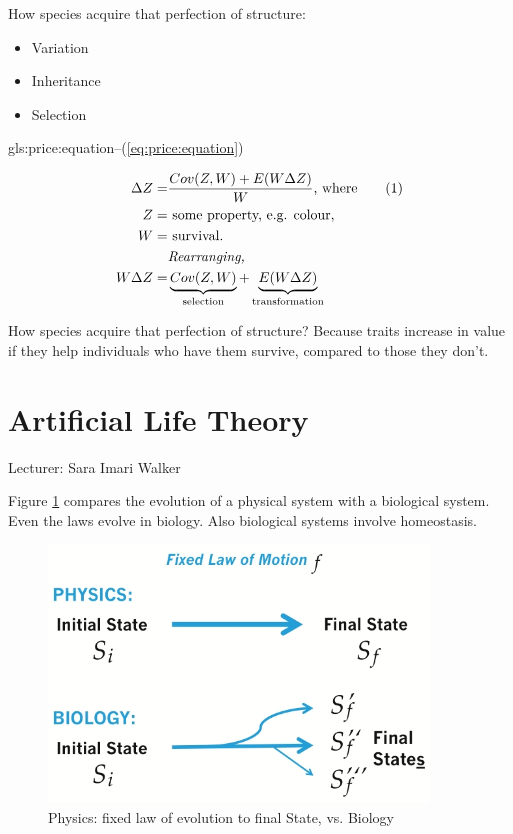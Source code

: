\documentclass[]{article}
\newcommand\numberthis{\addtocounter{equation}{1}\tag{\theequation}}
\begin{document}
How species acquire that perfection of structure:
\begin{itemize}
	\item Variation
	\item Inheritance
	\item Selection
\end{itemize}

\gls{gls:price:equation}--(\ref{eq:price:equation})

\begin{align*}
\Delta Z =& \frac{Cov(Z,W) + E(W \Delta Z)}{W}\text{, where} \numberthis \label{eq:price:equation}\\
Z=& \text{ some property, e.g. colour,}\\
W=& \text{ survival.}\\
 & \textit{Rearranging, }\\
W \Delta Z =& \underbrace{Cov(Z,W)}_\text{selection} + \underbrace{E(W \Delta Z)}_\text{transformation}
\end{align*}

How species acquire that perfection of structure? Because traits increase in value if they help individuals who have them survive, compared to those they don't.


\section{Artificial Life Theory}

Lecturer: Sara Imari Walker

Figure \ref{fig:PhysicsvsBiology} compares the evolution of a physical system with a biological system. Even the laws evolve in biology. Also biological systems involve homeostasis.
\begin{figure}[H]
	\caption{Physics: fixed law of evolution to final State, vs. Biology}\label{fig:PhysicsvsBiology}
	\includegraphics[width=0.9\textwidth]{PhysicsvsBiology}
\end{figure}
\end{document}
